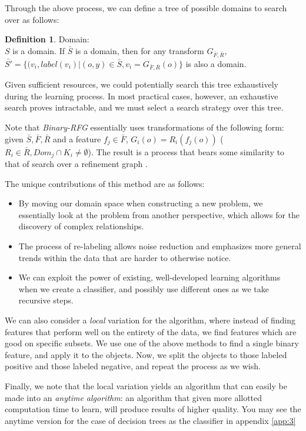 \documentclass[12pt, a4paper]{article}
\theoremstyle{definition}
\newtheorem{defn}{Definition}[section]
\begin{document}
Through the above process, we can define a tree of possible domains to search over as follows:
\begin{defn} Domain:\\%
$S$ is a domain.
If $\bar{S}$ is a domain, then for any transform $G_{\bar{F},\bar{R}}$, $\bar{S'}=\{(v_i,label(v_i)|(o,y)\in \bar{S}, v_i=G_{\bar{F},\bar{R}}(o)\}$ is also a domain.
\end{defn}
Given sufficient resources, we could potentially search this tree exhaustively during the learning process. In most practical cases, however, an exhaustive search proves intractable, and we must select a search strategy over this tree.

Note that \emph{Binary-RFG} essentially uses transformations of the following form: given $\bar{S},\bar{F},\bar{R}$ and a feature $f_{j}\in \bar{F}$, $G_{i}(o)=R_{i}(f_{j}(o))$ ($R_{i}\in \bar{R},Dom_{j}\cap K_{i}\neq \emptyset$).
The result is a process that bears some similarity to that of search over a refinement graph \citep{dvzeroski2001introduction,van1998completeness}.

The unique contributions of this method are as follows:
\begin{itemize}
    \item By moving our domain space when constructing a new problem, we essentially look at the problem from another perspective, which allows for the discovery of complex relationships.
    \item The process of re-labeling allows noise reduction and emphasizes more general trends within the data that are harder to otherwise notice.
    \item We can exploit the power of existing, well-developed learning algorithms when we create a classifier, and possibly use different ones as we take recursive steps.
\end{itemize}

We can also consider a \emph{local} variation for the algorithm, where instead of finding features that perform well on the entirety of the data, we find features which are good on specific subsets. We use one of the above methods to find a single binary feature, and apply it to the objects. Now, we split the objects to those labeled positive and those labeled negative, and repeat the process as we wish.

Finally, we note that the local variation yields an algorithm that can easily be made into an \emph{anytime algorithm}: an algorithm that given more allotted computation time to learn, will produce results of higher quality\citep{zilberstein1996using}. You may see the anytime version for the case of decision trees as the classifier in appendix \ref{app:3}
\end{document}
